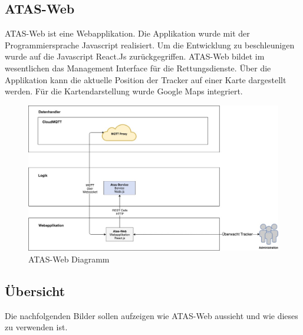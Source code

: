 \documentclass[11pt,english,german]{report}
\theoremstyle{definition}
\begin{document}
\subsection{ATAS-Web}
ATAS-Web ist eine Webapplikation. Die Applikation wurde mit der Programmiersprache Javascript realisiert. Um die Entwicklung zu beschleunigen wurde auf die Javascript React.Js zurückgegriffen. ATAS-Web bildet im wesentlichen das Management Interface für die Rettungsdienste. Über die Applikation kann die aktuelle Position der Tracker auf einer Karte dargestellt werden. Für die Kartendarstellung wurde Google Maps integriert.
\begin{figure}[H]
	\centering
	\includegraphics[width=\textwidth]{img/system/ATAS_SystemOverview_ATASWeb.jpg}
	\caption[ATAS-Web Diagramm]
	{ATAS-Web Diagramm}
\end{figure}

\newpage
\subsection{Übersicht}
Die nachfolgenden Bilder sollen aufzeigen wie ATAS-Web aussieht und wie dieses zu verwenden ist.
\end{document}
